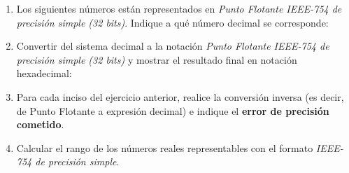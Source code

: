 \documentclass[12pt]{article}
\begin{document}
\begin{enumerate}

    \item Los siguientes números están representados en \emph{Punto Flotante
        IEEE-754 de precisión simple (32 bits)}. Indique a qué número decimal
        se corresponde:


    \item Convertir del sistema decimal a la notación \emph{Punto Flotante
        IEEE-754 de precisión simple (32 bits)} y mostrar el resultado final
        en notación hexadecimal:


    \item Para cada inciso del ejercicio anterior, realice la conversión
        inversa (es decir, de Punto Flotante a expresión decimal) e indique el
        \textbf{error de precisión cometido}.

    \item Calcular el rango de los números reales representables con el
        formato \emph{IEEE-754 de precisión simple}.

\end{enumerate}
\end{document}
